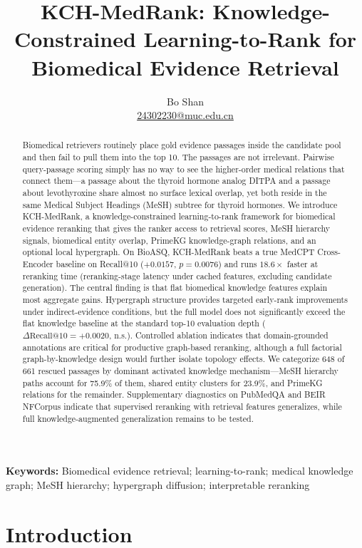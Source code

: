 \documentclass[11pt]{article}
\title{KCH-MedRank: Knowledge-Constrained Learning-to-Rank for Biomedical Evidence Retrieval}
\author{Bo Shan\\\href{mailto:24302230@muc.edu.cn}{24302230@muc.edu.cn}}
\date{}
\begin{document}
\maketitle

\begin{abstract}
Biomedical retrievers routinely place gold evidence passages inside the candidate pool and then fail to pull them into the top 10. The passages are not irrelevant. Pairwise query-passage scoring simply has no way to see the higher-order medical relations that connect them---a passage about the thyroid hormone analog DITPA and a passage about levothyroxine share almost no surface lexical overlap, yet both reside in the same Medical Subject Headings (MeSH) subtree for thyroid hormones. We introduce KCH-MedRank, a knowledge-constrained learning-to-rank framework for biomedical evidence reranking that gives the ranker access to retrieval scores, MeSH hierarchy signals, biomedical entity overlap, PrimeKG knowledge-graph relations, and an optional local hypergraph. On BioASQ, KCH-MedRank beats a true MedCPT Cross-Encoder baseline on Recall@10 ($+0.0157$, $p=0.0076$) and runs $18.6\times$ faster at reranking time (reranking-stage latency under cached features, excluding candidate generation). The central finding is that flat biomedical knowledge features explain most aggregate gains. Hypergraph structure provides targeted early-rank improvements under indirect-evidence conditions, but the full model does not significantly exceed the flat knowledge baseline at the standard top-10 evaluation depth ($\Delta{\text{Recall@10}}{=}+0.0020$, n.s.). Controlled ablation indicates that domain-grounded annotations are critical for productive graph-based reranking, although a full factorial graph-by-knowledge design would further isolate topology effects. We categorize 648 of 661 rescued passages by dominant activated knowledge mechanism---MeSH hierarchy paths account for 75.9\% of them, shared entity clusters for 23.9\%, and PrimeKG relations for the remainder. Supplementary diagnostics on PubMedQA and BEIR NFCorpus indicate that supervised reranking with retrieval features generalizes, while full knowledge-augmented generalization remains to be tested.
\end{abstract}

\vspace{5pt}
\noindent\textbf{Keywords:} Biomedical evidence retrieval; learning-to-rank; medical knowledge graph; MeSH hierarchy; hypergraph diffusion; interpretable reranking

\section{Introduction}

\end{document}
